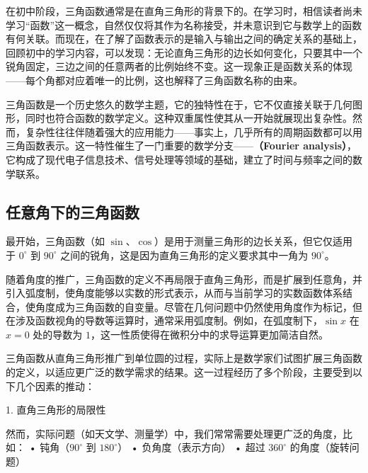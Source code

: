 \begin{issues}
\issueDraft
\end{issues}

在初中阶段，三角函数通常是在直角三角形的背景下的。在学习时，相信读者尚未学习“函数”这一概念，自然仅仅将其作为名称接受，并未意识到它与数学上的函数有何关联。而现在，在了解了函数表示的是输入与输出之间的确定关系的基础上，回顾初中的学习内容，可以发现：无论直角三角形的边长如何变化，只要其中一个锐角固定，三边之间的任意两者的比例始终不变。这一现象正是函数关系的体现——每个角都对应着唯一的比例，这也解释了三角函数名称的由来。

三角函数是一个历史悠久的数学主题，它的独特性在于，它不仅直接关联于几何图形，同时也符合函数的数学定义。这种双重属性使其从一开始就展现出复杂性。然而，复杂性往往伴随着强大的应用能力——事实上，几乎所有的周期函数都可以用三角函数表示。这一特性催生了一门重要的数学分支——\textbf{（Fourier analysis）}，它构成了现代电子信息技术、信号处理等领域的基础，建立了时间与频率之间的数学联系。

\subsection{任意角下的三角函数}

最开始，三角函数（如 $\sin$、$\cos$）是用于测量三角形的边长关系，但它仅适用于 $0^\circ$ 到 $90^\circ$ 之间的锐角，这是因为直角三角形的定义要求其中一角为 $90^\circ$。

随着角度的推广，三角函数的定义不再局限于直角三角形，而是扩展到任意角，并引入弧度制，使角度能够以实数的形式表示，从而与当前学习的实数函数体系结合，使角度成为三角函数的自变量。尽管在几何问题中仍然使用角度作为标记，但在涉及函数视角的导数等运算时，通常采用弧度制。例如，在弧度制下，$\sin x$ 在 $x=0$ 处的导数为 $1$，这一性质使得在微积分中的求导运算更加简洁自然。


三角函数从直角三角形推广到单位圆的过程，实际上是数学家们试图扩展三角函数的定义，以适应更广泛的数学需求的结果。这一过程经历了多个阶段，主要受到以下几个因素的推动：

1. 直角三角形的局限性

然而，实际问题（如天文学、测量学）中，我们常常需要处理更广泛的角度，比如：
	•	钝角（$90^\circ$ 到 $180^\circ$）
	•	负角度（表示方向）
	•	超过 $360^\circ$ 的角度（旋转问题）

